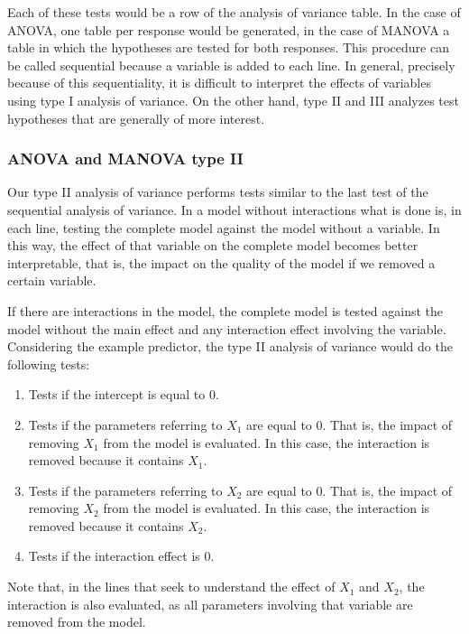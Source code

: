 \documentclass[AMA,STIX1COL]{WileyNJD-v2}
\begin{document}
Each of these tests would be a row of the analysis of variance table. In the case of ANOVA, one table per response would be generated, in the case of MANOVA a table in which the hypotheses are tested for both responses. This procedure can be called sequential because a variable is added to each line. In general, precisely because of this sequentiality, it is difficult to interpret the effects of variables using type I analysis of variance. On the other hand, type II and III analyzes test hypotheses that are generally of more interest.

\subsubsection{ANOVA and MANOVA type II}

Our type II analysis of variance performs tests similar to the last test of the sequential analysis of variance. In a model without interactions what is done is, in each line, testing the complete model against the model without a variable. In this way, the effect of that variable on the complete model becomes better interpretable, that is, the impact on the quality of the model if we removed a certain variable.

If there are interactions in the model, the complete model is tested against the model without the main effect and any interaction effect involving the variable. Considering the example predictor, the type II analysis of variance would do the following tests:

\begin{enumerate}
  \item Tests if the intercept is equal to 0.
  
  \item Tests if the parameters referring to $X_1$ are equal to 0. That is, the impact of removing $X_1$ from the model is evaluated. In this case, the interaction is removed because it contains $X_1$.
  
  \item Tests if the parameters referring to $X_2$ are equal to 0. That is, the impact of removing $X_2$ from the model is evaluated. In this case, the interaction is removed because it contains $X_2$.
  
  \item Tests if the interaction effect is 0.

\end{enumerate}

Note that, in the lines that seek to understand the effect of $X_1$ and $X_2$, the interaction is also evaluated, as all parameters involving that variable are removed from the model.
\end{document}
